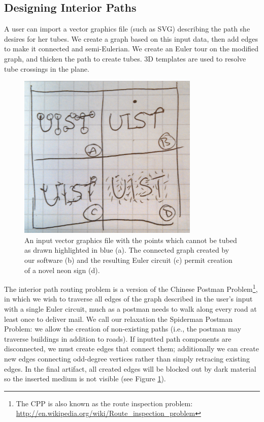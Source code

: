 \subsection{Designing Interior Paths}

A user can import a vector graphics file (such as SVG) describing the path she desires for her tubes.  We create a graph based on this input data, then add edges to make it connected and semi-Eulerian.  We create an Euler tour on the modified graph, and thicken the path to create tubes.  3D templates are used to resolve tube crossings in the plane.

\begin{figure}[h!]
\centering
    \includegraphics[width=3.4in]{figures/placeholder/interior.jpg}
\caption{An input vector graphics file with the points which cannot be tubed as drawn highlighted in {\color{blue}blue} (a).  The connected graph created by our software (b) and the resulting Euler circuit (c) permit creation of a novel neon sign (d).}
\label{fig:tool-process-interior}
\end{figure}

The interior path routing problem is a version of the Chinese Postman Problem\footnote{The CPP is also known as the route inspection problem: \url{http://en.wikipedia.org/wiki/Route_inspection_problem}}, in which we wish to traverse all edges of the graph described in the user's input with a single Euler circuit, much as a postman needs to walk along every road at least once to deliver mail.  We call our relaxation the Spiderman Postman Problem: we allow the creation of non-existing paths (i.e., the postman may traverse buildings in addition to roads).  If inputted path components are disconnected, we must create edges that connect them; additionally we can create new edges connecting odd-degree vertices rather than simply retracing existing edges.  In the final artifact, all created edges will be blocked out by dark material so the inserted medium is not visible (see Figure \ref{fig:tool-process-interior}).

